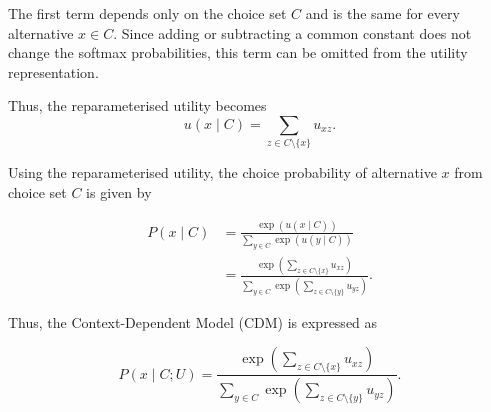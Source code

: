 \documentclass[12pt,oneside]{report}
\begin{document}
The first term depends only on the choice set $C$
and is the same for every alternative $x\in C$.
Since adding or subtracting a common constant
does not change the softmax probabilities,
this term can be omitted from the utility
representation.

Thus, the reparameterised utility becomes
\begin{equation}
\boxed{
u(x\mid C)
=
\sum_{z\in C\setminus\{x\}}u_{xz}.
}
\end{equation}

Using the reparameterised utility, the choice probability
of alternative $x$ from choice set $C$ is given by

\begin{align}
P(x\mid C)
&=
\frac{\exp(u(x\mid C))}
{\sum_{y\in C}\exp(u(y\mid C))}
\\[6pt]
&=
\frac{
\exp\left(
\sum_{z\in C\setminus\{x\}}u_{xz}
\right)
}{
\sum_{y\in C}
\exp\left(
\sum_{z\in C\setminus\{y\}}u_{yz}
\right)
}.
\end{align}

Thus, the Context-Dependent Model (CDM) is
expressed as

\begin{equation}
\boxed{
P(x\mid C;U)
=
\frac{
\exp\left(
\sum_{z\in C\setminus\{x\}}u_{xz}
\right)
}{
\sum_{y\in C}
\exp\left(
\sum_{z\in C\setminus\{y\}}u_{yz}
\right)
}
}.
\end{equation}
\end{document}
